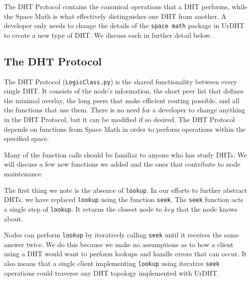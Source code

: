 \documentclass[11pt,conference]{IEEEtran}
\begin{document}
The DHT Protocol contains the canonical operations that a DHT performs, while the Space Math is what effectively distinguishes one DHT from another.
A developer only needs to change the details of the \texttt{space math} package in UrDHT to create a new type of DHT.
We discuss each in further detail below.

\subsection{The DHT Protocol }
\label{sec:protocol}

The DHT Protocol (\texttt{LogicClass.py}) \cite{urdht} is the shared functionality between every single DHT.
It consists of the node's information, the short peer list that defines the minimal overlay, the long peers that make efficient routing possible, and all the functions that use them.
There is no need for a developer to change anything in the DHT Protocol, but it can be modified if so desired.
The DHT Protocol depends on functions from Space Math in order to perform operations within the specified space.

Many of the function calls should be familiar to anyone who has study DHTs.
We will discuss a few new functions we added and the ones that contribute to node maintenance.



The first thing we note is the absence of \texttt{lookup}.
In our efforts to further abstract DHTs, we have replaced \texttt{lookup} using the function \texttt{seek}.
The \texttt{seek} function acts a single step of \texttt{lookup}.
It returns the closest node to $ key $ that the node knows about.

Nodes can perform \texttt{lookup} by iteratively calling \texttt{seek} until it receives the same answer twice.
We do this because we make no assumptions as to how a client using a DHT would want to perform lookups and handle errors that can occur.
It also means that a single client implementing \texttt{lookup} using iterative \texttt{seek} operations could traverse any DHT topology implemented with UrDHT.

%
%
%
\end{document}
